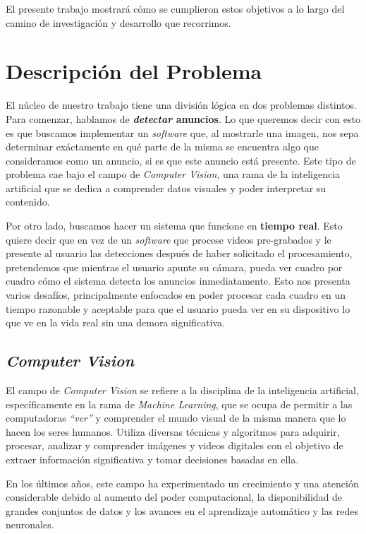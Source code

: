 \documentclass[a4paper]{article}
\begin{document}
El presente trabajo mostrará cómo se cumplieron estos objetivos a lo largo del camino de investigación y desarrollo que recorrimos.

\section{Descripción del Problema}

El núcleo de nuestro trabajo tiene una división lógica en dos problemas distintos. \\

Para comenzar, hablamos de \textbf{\textit{detectar} anuncios}. Lo que queremos decir con esto es que buscamos implementar un \textit{software} que, al mostrarle una imagen, nos sepa determinar exáctamente en qué parte de la misma se encuentra algo que consideramos como un anuncio, si es que este anuncio está presente.
Este tipo de problema cae bajo el campo de \textit{Computer Vision}, una rama de la inteligencia artificial que se dedica a comprender datos visuales y poder interpretar su contenido.

Por otro lado, buscamos hacer un sistema que funcione en \textbf{tiempo real}. Esto quiere decir que en vez de un \textit{software} que procese videos pre-grabados y le presente al usuario las detecciones después de haber solicitado el procesamiento, pretendemos que mientras el usuario apunte su cámara, pueda ver cuadro por cuadro cómo el sistema detecta los anuncios inmediatamente.
Esto nos presenta varios desafíos, principalmente enfocados en poder procesar cada cuadro en un tiempo razonable y aceptable para que el usuario pueda ver en su dispositivo lo que ve en la vida real sin una demora significativa.

\subsection{\textit{Computer Vision}}

El campo de \textit{Computer Vision} se refiere a la disciplina de la inteligencia artificial, específicamente en la rama de \textit{Machine Learning}, que se ocupa de permitir a las computadoras \textit{``ver''} y comprender el mundo visual de la misma manera que lo hacen los seres humanos. Utiliza diversas técnicas y algoritmos para adquirir, procesar, analizar y comprender imágenes y videos digitales con el objetivo de extraer información significativa y tomar decisiones basadas en ella.

En los últimos años, este campo ha experimentado un crecimiento y una atención considerable debido al aumento del poder computacional, la disponibilidad de grandes conjuntos de datos y los avances en el aprendizaje automático y las redes neuronales.
\end{document}
